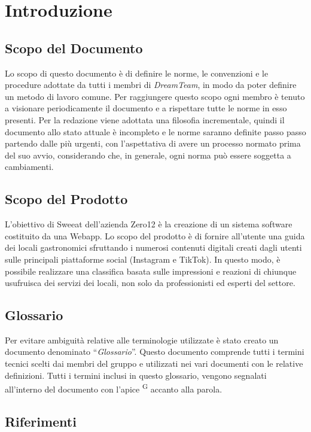 \section{Introduzione}

\subsection{Scopo del Documento}
Lo scopo di questo documento è di definire le norme, le convenzioni e le procedure adottate da tutti i membri di \textit{DreamTeam}, in modo da poter definire un metodo di lavoro comune.
Per raggiungere questo scopo ogni membro è tenuto a visionare periodicamente il documento e a rispettare tutte le norme in esso presenti. 
Per la redazione viene adottata una filosofia incrementale, quindi il documento allo stato attuale è incompleto e le norme saranno definite passo passo partendo dalle più urgenti, con l'aspettativa di avere un processo normato prima del suo avvio, considerando che, in generale, ogni norma può essere soggetta a cambiamenti.


\subsection{Scopo del Prodotto}
L’obiettivo di Sweeat dell’azienda Zero12 è la creazione di un sistema software costituito da una Webapp. Lo scopo del prodotto è di fornire all’utente una guida dei locali gastronomici sfruttando i numerosi contenuti digitali creati dagli utenti sulle principali piattaforme social (Instagram e TikTok). In questo modo, è possibile realizzare una classifica basata sulle impressioni e reazioni di chiunque usufruisca dei servizi dei locali, non solo da professionisti ed esperti del settore.


\subsection{Glossario}
Per evitare ambiguità relative alle terminologie utilizzate è stato creato un documento denominato “\textit{Glossario}”. Questo documento comprende tutti i termini tecnici scelti dai membri del gruppo e utilizzati nei vari documenti con le relative definizioni. Tutti i termini inclusi in questo glossario, vengono segnalati all’interno del documento con l’apice \textsuperscript{G} accanto alla parola.

\subsection{Riferimenti}
